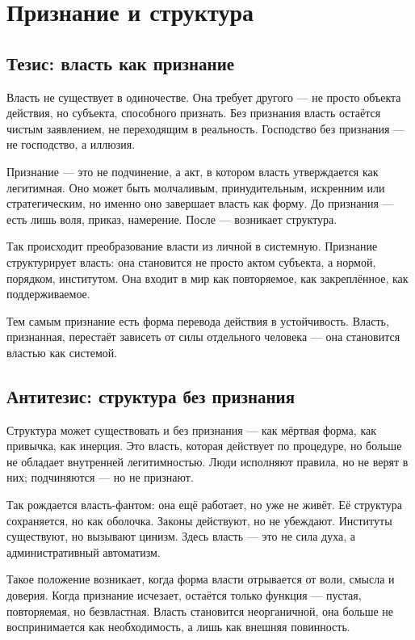 \chapter{Признание и структура}

\section{Тезис: власть как признание}

Власть не существует в одиночестве. Она требует другого — не просто объекта действия, но субъекта, способного признать. Без признания власть остаётся чистым заявлением, не переходящим в реальность. Господство без признания — не господство, а иллюзия.

Признание — это не подчинение, а акт, в котором власть утверждается как легитимная. Оно может быть молчаливым, принудительным, искренним или стратегическим, но именно оно завершает власть как форму. До признания — есть лишь воля, приказ, намерение. После — возникает структура.

Так происходит преобразование власти из личной в системную. Признание структурирует власть: она становится не просто актом субъекта, а нормой, порядком, институтом. Она входит в мир как повторяемое, как закреплённое, как поддерживаемое.

Тем самым признание есть форма перевода действия в устойчивость. Власть, признанная, перестаёт зависеть от силы отдельного человека — она становится властью как системой.

\section{Антитезис: структура без признания}

Структура может существовать и без признания — как мёртвая форма, как привычка, как инерция. Это власть, которая действует по процедуре, но больше не обладает внутренней легитимностью. Люди исполняют правила, но не верят в них; подчиняются — но не признают.

Так рождается власть-фантом: она ещё работает, но уже не живёт. Её структура сохраняется, но как оболочка. Законы действуют, но не убеждают. Институты существуют, но вызывают цинизм. Здесь власть — это не сила духа, а административный автоматизм.

Такое положение возникает, когда форма власти отрывается от воли, смысла и доверия. Когда признание исчезает, остаётся только функция — пустая, повторяемая, но безвластная. Власть становится неорганичной, она больше не воспринимается как необходимость, а лишь как внешняя повинность.


